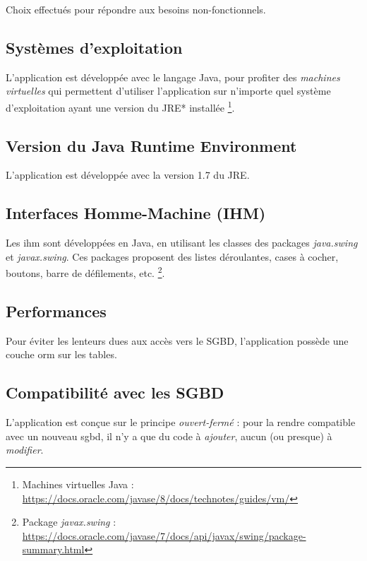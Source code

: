 Choix effectués pour répondre aux besoins non-fonctionnels.

\subsection{Systèmes d'exploitation}
L'application est développée avec le langage Java, pour profiter des \textit{machines virtuelles} qui permettent d'utiliser l'application sur n'importe quel système d'exploitation ayant une version du \gls{JRE}* installée
\footnote{\label{les_machines_virtuelles}Machines virtuelles Java : \url{https://docs.oracle.com/javase/8/docs/technotes/guides/vm/}}.

\subsection{Version du Java Runtime Environment}
L'application est développée avec la version 1.7 du \gls{JRE}.

\subsection{Interfaces Homme-Machine (IHM)}
Les \gls{ihm} sont développées en Java, en utilisant les classes des packages \textit{java.swing} et \textit{javax.swing}.
Ces packages proposent des listes déroulantes, cases à cocher, boutons, barre de défilements, etc.
\footnote{\label{element_de_formulaire}Package \textit{javax.swing} : \url{https://docs.oracle.com/javase/7/docs/api/javax/swing/package-summary.html}}.

\subsection{Performances}
Pour éviter les lenteurs dues aux accès vers le SGBD, l'application possède une couche \gls{orm} sur les tables.

\subsection{Compatibilité avec les SGBD}
L'application est conçue sur le principe \textit{ouvert-fermé} : pour la rendre compatible avec un nouveau \gls{sgbd}, il n'y a que du code à \textit{ajouter}, aucun (ou presque) à \textit{modifier}.
